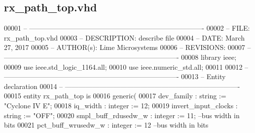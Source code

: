 \subsection{rx\+\_\+path\+\_\+top.\+vhd}
\label{rx__path__top_8vhd_source}

\begin{DoxyCode}
00001 \textcolor{keyword}{-- ---------------------------------------------------------------------------- }
00002 \textcolor{keyword}{-- FILE:    rx\_path\_top.vhd}
00003 \textcolor{keyword}{-- DESCRIPTION:   describe file}
00004 \textcolor{keyword}{-- DATE: March 27, 2017}
00005 \textcolor{keyword}{-- AUTHOR(s):  Lime Microsystems}
00006 \textcolor{keyword}{-- REVISIONS:}
00007 \textcolor{keyword}{-- ---------------------------------------------------------------------------- }
00008 \textcolor{vhdlkeyword}{library }\textcolor{keywordflow}{ieee};
00009 \textcolor{vhdlkeyword}{use }ieee.std\_logic\_1164.\textcolor{keywordflow}{all};
00010 \textcolor{vhdlkeyword}{use }ieee.numeric\_std.\textcolor{keywordflow}{all};
00011 
00012 \textcolor{keyword}{-- ----------------------------------------------------------------------------}
00013 \textcolor{keyword}{-- Entity declaration}
00014 \textcolor{keyword}{-- ----------------------------------------------------------------------------}
00015 \textcolor{keywordflow}{entity }rx_path_top \textcolor{keywordflow}{is}
00016    \textcolor{keywordflow}{generic}\textcolor{vhdlchar}{(} 
00017       \textcolor{vhdlchar}{dev_family}           \textcolor{vhdlchar}{:} \textcolor{comment}{string} \textcolor{vhdlchar}{:=} \textcolor{keyword}{"Cyclone IV E"};
00018       \textcolor{vhdlchar}{iq_width}             \textcolor{vhdlchar}{:} \textcolor{comment}{integer} \textcolor{vhdlchar}{:=} \textcolor{vhdllogic}{}\textcolor{vhdllogic}{12};
00019       \textcolor{vhdlchar}{invert_input_clocks}  \textcolor{vhdlchar}{:} \textcolor{comment}{string} \textcolor{vhdlchar}{:=} \textcolor{keyword}{"OFF"};
00020       \textcolor{vhdlchar}{smpl_buff_rdusedw_w}  \textcolor{vhdlchar}{:} \textcolor{comment}{integer} \textcolor{vhdlchar}{:=} \textcolor{vhdllogic}{}\textcolor{vhdllogic}{11};\textcolor{keyword}{ --bus width in bits }
00021       \textcolor{vhdlchar}{pct_buff_wrusedw_w}   \textcolor{vhdlchar}{:} \textcolor{comment}{integer} \textcolor{vhdlchar}{:=} \textcolor{vhdllogic}{}\textcolor{vhdllogic}{12}\textcolor{keyword}{  --bus width in bits}

\end{DoxyCode}
